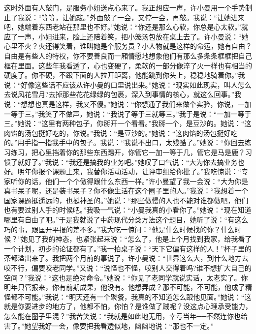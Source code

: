 \documentclass[12pt,oneside]{book}
\begin{document}
这时外面有人敲门，是服务小姐送点心来了。我正想应一声，许小曼用一个手势制止了我说：``等等，让她敲。''外面敲了一会，又停一会，再敲。我说：``让她进来吧，她端着东西老站在那里也不好。''她说：``你还是那么心软，你总是心太软。''就应了一声，小姐进来，脸上还陪着笑，把小笼汤包放在桌上去了。许小曼说：``她心里不火？火还得笑着，谁叫她是个服务员？小人物就是这样的命运，她有自由？自由是有些人的特权，你不要善良而一厢情愿地想象他们有那么多条条框框把自己框在里面。这些年我看透了，心也变硬了，柔软的一部分像淬了火一样也有相当的硬度了。你不硬，不跟下面的人拉开距离，他能跳到你头上，稳稳地骑着你。''我说：``好像这些话不应该从许小曼的口里说出来。''她说：``现实如此现实，叫人怎么去说风花雪月?去掉那些花花绿绿的包裹，深入到事情的核心，就这么回事。''我说：``想想也真是这样，我又不傻。''她说：``你想通了我们来做个实验，你说，一加一等于三。''我笑了不做声，她说：``我说了等于三就等三。''我于是说：``一加一等于三。''她说：``这里有两种包子，你掰开一个看看。''我掰一个，是豆沙的。她说：``这肉馅的汤包挺好吃的，你说。''我说：``是豆沙的。''她说：``这肉馅的汤包挺好吃的。''用手指一指我手中的包子。我说：``我说不出口，太残酷了。''她说：``你回去练习练习，把心里挡着你的那些东西踢开，你管它一加一等于几，管它是马是鹿？习惯了就好了。''我说：``我还是搞我的业务吧。''她叹了口气说：``大为你去搞业务也好。明年你报个课题上来，我替你活动活动，让评审组给你批了。''我吃惊说：``专家听你的话，他们一个个傲得跟什么东西一样。''许小曼望了我一会说：``大为你是真书呆子呢，还是装书呆子？你不像生活在这个圈子里的人。''我说：``我想着一个国家课题挺遥远的，也挺神圣的。''她说：``那些傲慢的人也不能对谁都傲吧，他们也有要过别人手的时候吧。''我吸一气说：``小曼我真的小看你了。''她说：``现在知道哪里有自由了吧。''于是我就说了中药现代分类方法这个题目，她听了说：``有这么巧的事，跟匡开平报的差不多。''我大吃一惊问：``他是什么时候找的你？什么时候？''她见了我的神态，也紧张起来说：``怎么了，他是上个月找到我家，给我看了一个计划，初步的论证都有了。''我一拍桌子说：``天下它偏有这样的人！''杯子里的茶都溢出来了。我把两个月前的事说了，许小曼说：``世界这么大，到什么地方去咬不行，偏要咬老同学。''又说：``说怪也不怪，咬别人交得着吗?谁不想扩大自己的空间？''我说：``这也是绝对命令。''她说：``你见了老同学就说实话，太老实了。你明年只管报来，你有前期成果，他没有。他想弄成？那不可能，不可能，他成了精怪都不可能。''我说：``明天还有一个聚餐，我真的不知道怎么跟他见面。''她说：``这就是你要进步的地方了，他都不怕，你怕？是谁做了贼呢？没这点心理承受能力，怎么能在圈子里混？''我苦笑说：``我就是如此地无用，幸亏当年──不然连你也给害了。''她望我好一会，像要把我看透似地，幽幽地说：``那也不一定。''
\end{document}
